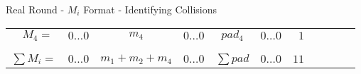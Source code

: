 \begin{frame}{Real Round - $M_i$ Format - Identifying Collisions}
{\begin{tabular}{ccccccrllll}
\multicolumn{1}{c|}{$\ \ \ M_4 = $}      & \multicolumn{1}{c|}{$0 \dotsc 0$} & \multicolumn{1}{c|}{$m_4$}             & \multicolumn{1}{c|}{$0 \dotsc 0$} & \multicolumn{1}{c|}{$pad_4$}    & \multicolumn{1}{c|}{$0 \dotsc 0$} & \multicolumn{1}{r|}{$1$}  &  &  &  &  \\ \cline{2-7}
\multicolumn{1}{l}{}               & \multicolumn{1}{l}{}              & \multicolumn{1}{l}{}                   & \multicolumn{1}{l}{}              & \multicolumn{1}{l}{}            & \multicolumn{1}{l}{}              &                           &  &  &  &  \\ %

\cline{1-7}\\
\cline{2-7}
\multicolumn{1}{c|}{$\sum M_i = $} & \multicolumn{1}{c|}{$0 \dotsc 0$} & \multicolumn{1}{c|}{$m_1 + m_2 + m_4$} & \multicolumn{1}{c|}{$0 \dotsc 0$} & \multicolumn{1}{c|}{$\sum pad$} & \multicolumn{1}{c|}{$0 \dotsc 0$} & \multicolumn{1}{r|}{$11$} &  &  &  &  \\ \cline{2-7}
\end{tabular}}

\end{frame}